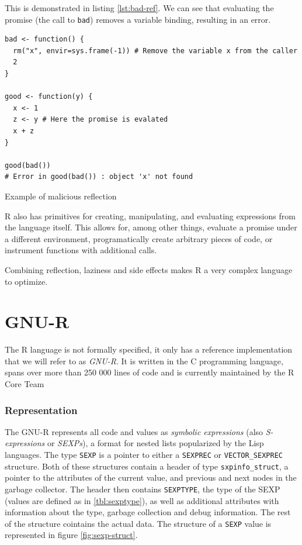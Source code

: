 This is demonstrated in listing \ref{lst:bad-ref}. We can see that evaluating the promise (the call to \texttt{bad}) removes a variable binding, resulting in an error.

\begin{listing}
	\centering
	\begin{verbatim}
bad <- function() {
  rm("x", envir=sys.frame(-1)) # Remove the variable x from the caller
  2
}

good <- function(y) {
  x <- 1
  z <- y # Here the promise is evalated
  x + z
}

good(bad())
# Error in good(bad()) : object 'x' not found
  \end{verbatim}
	\caption{Example of malicious reflection\cite{r-melts-brains}}\label{lst:bad-ref}
\end{listing}

R also has primitives for creating, manipulating, and evaluating expressions from the language itself. This allows for, among other things, evaluate a promise under a different environment, programatically create arbitrary pieces of code, or instrument functions with additional calls.

Combining reflection, laziness and side effects makes R a very complex language to optimize.

\newpage
\section{GNU-R}

The R language is not formally specified, it only has a reference implementation that we will refer to as \textit{GNU-R}. It is written in the C programming language, spans over more than {250 000} lines of code and is currently maintained by the R Core Team

\subsubsection*{Representation}

The GNU-R represents all code and values as \textit{symbolic expressions} (also \textit{S-expressions} or \textit{SEXPs}), a format for nested lists popularized by the Lisp languages. The type \texttt{SEXP} is a pointer to either a \texttt{SEXPREC} or \texttt{VECTOR\_SEXPREC} structure. Both of these structures contain a header of type \texttt{sxpinfo\_struct}, a pointer to the attributes of the current value, and previous and next nodes in the garbage collector. The header then contains \texttt{SEXPTYPE}, the type of the SEXP (values are defined as in \ref{tbl:sexptype}), as well as additional attributes with information about the type, garbage collection and debug information. The rest of the structure cointains the actual data. The structure of a \texttt{SEXP} value is represented in figure \ref{fig:sexp-struct}.

